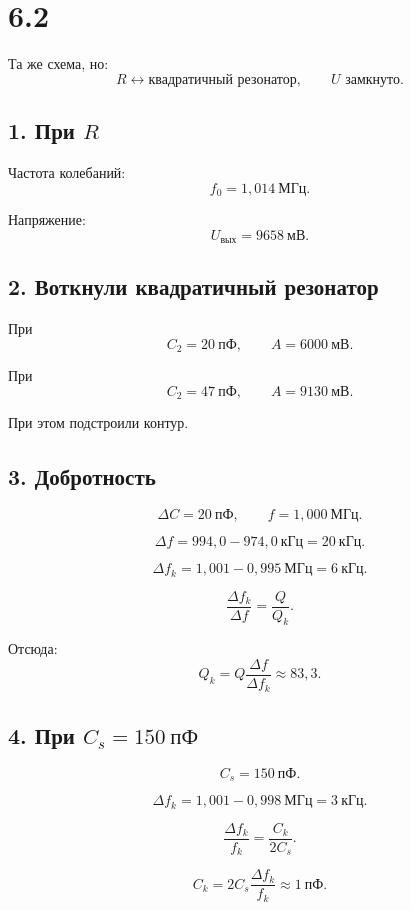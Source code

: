 \documentclass[a4paper,12pt]{article}
\begin{document}
\section*{6.2}

Та же схема, но:
\[
R \longleftrightarrow \text{квадратичный резонатор},
\qquad
U \text{ замкнуто}.
\]

\subsection*{1. При $R$}

Частота колебаний:
\[
f_0 = 1{,}014\ \text{МГц}.
\]

Напряжение:
\[
U_{\text{вых}} = 9658\ \text{мВ}.
\]

\subsection*{2. Воткнули квадратичный резонатор}

При
\[
C_2 = 20\ \text{пФ},
\qquad
A = 6000\ \text{мВ}.
\]

При
\[
C_2 = 47\ \text{пФ},
\qquad
A = 9130\ \text{мВ}.
\]

При этом подстроили контур.

\subsection*{3. Добротность}

\[
\Delta C = 20\ \text{пФ},
\qquad
f = 1{,}000\ \text{МГц}.
\]

\[
\Delta f = 994{,}0 - 974{,}0\ \text{кГц}
= 20\ \text{кГц}.
\]

\[
\Delta f_k = 1{,}001 - 0{,}995\ \text{МГц}
= 6\ \text{кГц}.
\]

\[
\frac{\Delta f_k}{\Delta f}
=
\frac{Q}{Q_k}.
\]

Отсюда:
\[
Q_k = Q \frac{\Delta f}{\Delta f_k}
\approx 83{,}3.
\]

\subsection*{4. При $C_s = 150\ \text{пФ}$}

\[
C_s = 150\ \text{пФ}.
\]

\[
\Delta f_k = 1{,}001 - 0{,}998\ \text{МГц}
= 3\ \text{кГц}.
\]

\[
\frac{\Delta f_k}{f_k}
=
\frac{C_k}{2C_s}.
\]

\[
C_k = 2C_s\frac{\Delta f_k}{f_k}
\approx 1\ \text{пФ}.
\]
\end{document}
